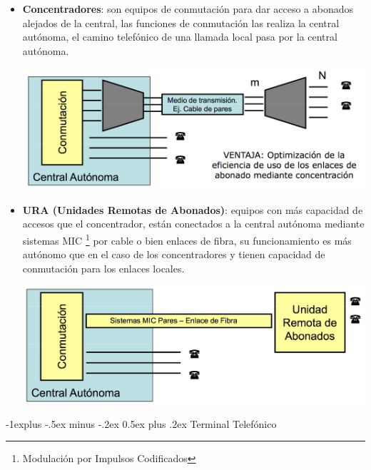 \documentclass[10pt,portrait, twocolumn]{article}
\makeatletter
\renewcommand{\subsection}{\@startsection{subsection}{2}{0mm}%
                                {-1explus -.5ex minus -.2ex}%
                                {0.5ex plus .2ex}%
                                {\normalfont\normalsize\bfseries}}
\makeatother
\begin{document}
	\begin{itemize}
		\item  \textbf{Concentradores}: son equipos de conmutación para dar acceso a abonados alejados de la central, las funciones de conmutación las realiza la central autónoma, el camino telefónico de una llamada local pasa por la central autónoma.

				\begin{center}
					\includegraphics[scale=0.2]{images/RedAcceso}
				\end{center}
		
		\item \textbf{URA (Unidades Remotas de Abonados)}: equipos con más capacidad de accesos que el concentrador, están conectados a la central autónoma mediante sistemas MIC \footnote{Modulación por Impulsos Codificados} por cable o bien enlaces de fibra, su funcionamiento es más autónomo que en el caso de los concentradores y tienen capacidad de conmutación para los enlaces locales.

			\begin{center}
				\includegraphics[scale=0.2]{images/RDI}
			\end{center}
	\end{itemize}

		
\hrulefill		

\subsection{Terminal Telefónico}
\end{document}
